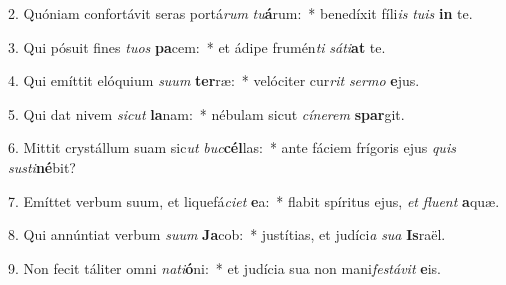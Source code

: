 2. Quóniam confortávit seras portá\textit{rum} \textit{tu}\textbf{á}rum:~*  benedíxit fíli\textit{is} \textit{tu}\textit{is} \textbf{in} te.\

3. Qui pósuit fines \textit{tu}\textit{os} \textbf{pa}cem:~*  et ádipe frumén\textit{ti} \textit{sá}\textit{ti}\textbf{at} te.\

4. Qui emíttit elóquium \textit{su}\textit{um} \textbf{ter}ræ:~*  velóciter cur\textit{rit} \textit{ser}\textit{mo} \textbf{e}jus.\

5. Qui dat nivem \textit{sic}\textit{ut} \textbf{la}nam:~*  nébulam sicut \textit{cí}\textit{ne}\textit{rem} \textbf{spar}git.\

6. Mittit crystállum suam sic\textit{ut} \textit{buc}\textbf{cél}las:~*  ante fáciem frígoris ejus \textit{quis} \textit{sus}\textit{ti}\textbf{né}bit?\

7. Emíttet verbum suum, et liquefá\textit{ci}\textit{et} \textbf{e}a:~*  flabit spíritus ejus, \textit{et} \textit{flu}\textit{ent} \textbf{a}quæ.\

8. Qui annúntiat verbum \textit{su}\textit{um} \textbf{Ja}cob:~*  justítias, et judíci\textit{a} \textit{su}\textit{a} \textbf{Is}raël.\

9. Non fecit táliter omni \textit{na}\textit{ti}\textbf{ó}ni:~*  et judícia sua non mani\textit{fes}\textit{tá}\textit{vit} \textbf{e}is.\

